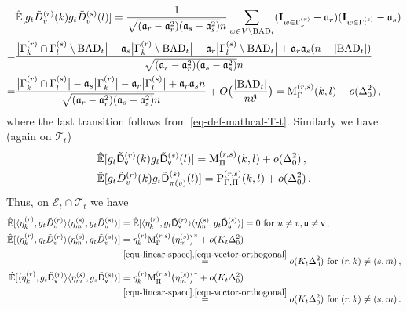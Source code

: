 \documentclass[11pt]{article}
\numberwithin{equation}{section}
\begin{document}
\begin{align*}
    & \Hat{\mathbb{E}} [ g_t\Tilde{D}^{(r)}_v (k) g_t\Tilde{D}^{(s)}_v (l) ] = \frac{1}{ \sqrt{(\mathfrak{a}_r-\mathfrak{a}_r^2)(\mathfrak{a}_s-\mathfrak{a}_s^2)} n} \sum_{w \in V \setminus \mathrm{BAD}_{t}} (\mathbf{I}_{w \in \Gamma^{(r)}_k} - \mathfrak{a}_r) (\mathbf{I}_{w \in \Gamma^{(s)}_l} - \mathfrak{a}_s) \\
    =& \frac{ \big| \Gamma^{(r)}_k \cap \Gamma^{(s)}_l \setminus \mathrm{BAD}_{t} \big| - \mathfrak{a}_s \big| \Gamma^{(r)}_k \setminus \mathrm{BAD}_{t} \big| - \mathfrak{a}_r \big| \Gamma^{(s)}_l \setminus \mathrm{BAD}_{t} \big| + \mathfrak{a}_r \mathfrak{a}_s (n-|\mathrm{BAD}_{t}|)  }{\sqrt{(\mathfrak{a}_r-\mathfrak{a}_r^2) (\mathfrak{a}_s-\mathfrak{a}_s^2)}n}  \\
    =& \frac{\big|\Gamma^{(r)}_k \cap \Gamma^{(s)}_l \big| - \mathfrak{a}_s \big|\Gamma^{(r)}_k \big| - \mathfrak{a}_r \big|\Gamma^{(s)}_l \big| +  \mathfrak{a}_r \mathfrak{a}_s n} {\sqrt{(\mathfrak{a}_r-\mathfrak{a}_r^2) (\mathfrak{a}_s-\mathfrak{a}_s^2)}n} + O\big(\frac{ |\mathrm{BAD}_{t}| }{n \vartheta}\big) = \mathrm{M}^{(r,s)}_{\Gamma} (k,l) + o( \Delta^2_{0} ) \,,
\end{align*}
where the last transition follows from \eqref{eq-def-mathcal-T-t}. Similarly we have (again on $\mathcal T_t$)
\begin{align*}
    & \Hat{\mathbb{E}} [ g_t\Tilde{\mathsf{D}}^{(r)}_{\mathsf{v}} (k) g_t\Tilde{\mathsf{D}}^{(s)}_{\mathsf{v}} (l) ] = \mathrm{M}^{(r,s)}_{\Pi} (k,l) + o( \Delta^2_{0} ) \,, \\
    & \Hat{\mathbb{E}} [ g_t\Tilde{{D}}^{(r)}_v (k) g_t\Tilde{\mathsf{D}}^{(s)}_{\pi(v)} (l) ] = \mathrm{P}^{(r,s)}_{\Gamma,\Pi} (k,l) + o( \Delta^2_{0} ) \,.
\end{align*}
Thus, on $\mathcal E_t \cap \mathcal T_t$ we have
\begin{align}
    \Hat{\mathbb{E}}[\langle \eta^{(r)}_k, g_t\Tilde{D}^{(r)}_v \rangle \langle \eta^{(s)}_m, g_t\Tilde{D}^{(s)}_u \rangle] &= \Hat{\mathbb{E}}[ \langle \eta^{(r)}_k, g_t\Tilde{\mathsf{D}}^{(r)}_{\mathsf{v}} \rangle \langle \eta^{(s)}_m, g_t\Tilde{\mathsf{D}}^{(s)}_{\mathsf{u}} \rangle ]=0  \mbox{ for } u\neq v, \mathsf u\neq \mathsf v\,, \label{equ-degree-correlation-1} \\
    \Hat{\mathbb{E}}[\langle \eta^{(r)}_k, g_t\Tilde{D}^{(r)}_v \rangle \langle \eta^{(s)}_m, g_t\Tilde{D}^{(s)}_v \rangle] &= \eta^{(r)}_k \mathrm{M}_{\Gamma}^{(r,s)} \big( \eta^{(s)}_m \big)^{*} + o(K_t \Delta_0^2)  \nonumber  \\ 
    & \overset{ \eqref{equ-linear-space}, \eqref{equ-vector-orthogonal} }{=} o( K_t \Delta_0^2) \mbox{ for } (r,k) \neq (s,m) \,,  \label{equ-degree-correlation-2}\\
    \Hat{\mathbb{E}}[\langle \eta^{(r)}_k, g_t\Tilde{\mathsf{D}}^{(r)}_{\mathsf{v}} \rangle \langle \eta^{(s)}_m, g_s\Tilde{\mathsf{D}}^{(s)}_{\mathsf{v}} \rangle] &= \eta^{(r)}_k \mathrm{M}_{\Pi}^{(r,s)} \big( \eta^{(s)}_m \big)^{*} + o(K_t \Delta_0^2)  \nonumber \\
    &\overset{ \eqref{equ-linear-space}, \eqref{equ-vector-orthogonal} }{=} o(K_t \Delta_0^2 ) \mbox{ for } (r,k) \neq (s,m)  \,. \label{equ-degree-correlation-3}  
\end{align}
\end{document}
